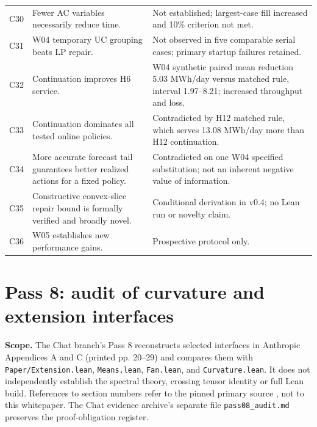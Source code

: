 \documentclass[11pt,letterpaper]{article}
\begin{document}
\begin{longtable}{P{.10\linewidth}P{.46\linewidth}P{.35\linewidth}}
C30 & Fewer AC variables necessarily reduce time. & Not established; largest-case fill increased and 10\% criterion not met.\\
C31 & W04 temporary UC grouping beats LP repair. & Not observed in five comparable serial cases; primary startup failures retained.\\
C32 & Continuation improves H6 service. & W04 synthetic paired mean reduction 5.03 MWh/day versus matched rule, interval 1.97--8.21; increased throughput and loss.\\
C33 & Continuation dominates all tested online policies. & Contradicted by H12 matched rule, which serves 13.08 MWh/day more than H12 continuation.\\
C34 & More accurate forecast tail guarantees better realized actions for a fixed policy. & Contradicted on one W04 specified substitution; not an inherent negative value of information.\\
C35 & Constructive convex-slice repair bound is formally verified and broadly novel. & Conditional derivation in v0.4; no Lean run or novelty claim.\\
C36 & W05 establishes new performance gains. & Prospective protocol only.\\
\bottomrule
\end{longtable}
\endgroup

\section{Pass 8: audit of curvature and extension interfaces}
\label{sec:pass08}
\textbf{Scope.} The Chat branch's Pass 8 reconstructs selected interfaces in Anthropic Appendices A and C (printed pp. 20--29) and compares them with \texttt{Paper/Extension.lean}, \texttt{Means.lean}, \texttt{Fan.lean}, and \texttt{Curvature.lean}. It does not independently establish the spectral theory, crossing tensor identity or full Lean build. References to section numbers refer to the pinned primary source \cite{anthropic}, not to this whitepaper. The Chat evidence archive's separate file \texttt{pass08\_audit.md} preserves the proof-obligation register.
\end{document}
